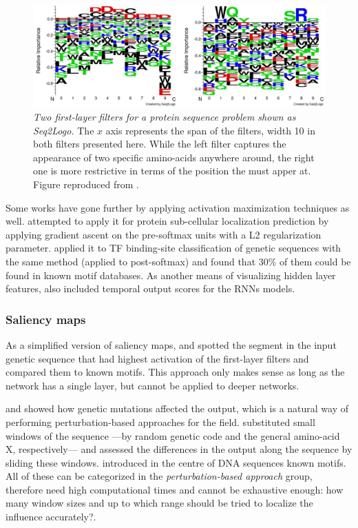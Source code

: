 		\begin{figure}
		\centering
		\includegraphics[width=0.7\linewidth]{Figures/seqlogo}
		\caption{\textit{Two first-layer filters for a protein sequence problem shown as Seq2Logo.} The $x$ axis represents the span of the filters, width 10 in both filters presented here. While the left filter captures the appearance of two specific amino-acids anywhere around, the right one is more restrictive in terms of the position the must apper at. Figure reproduced from \cite{Fontal2017}.}
		\label{fig:seqlogo}
		\end{figure}
		
		Some works have gone further by applying activation maximization techniques as well. \cite{Fontal2017} attempted to apply it for protein sub-cellular localization prediction by applying gradient ascent on the pre-softmax units with a L2 regularization parameter. \cite{Lanchantin2016} applied it to TF binding-site classification of genetic sequences with the same method (applied to post-softmax) and found that 30\% of them could be found in known motif databases. As another means of visualizing hidden layer features, \cite{Lanchantin2016} also included temporal output scores for the RNNs models.
	
		\subsubsection*{Saliency maps}
		As a simplified version of saliency maps, \cite{Alipanahi2015} and \cite{Quang2016} spotted the segment in the input genetic sequence that had highest activation of the first-layer filters and compared them to known motifs. This approach only makes sense as long as the network has a single layer, but cannot be applied to deeper networks.
		
		\cite{Alipanahi2015} and \cite{Zhou2015} showed how genetic mutations affected the output, which is a natural way of performing perturbation-based approaches for the field. \cite{Umarov2017,Fontal2017} substituted small windows of the sequence ---by random genetic code and the general amino-acid X, respectively--- and assessed the differences in the output along the sequence by sliding these windows. \cite{Kelley2016} introduced in the centre of DNA sequences known motifs. All of these can be categorized in the \textit{perturbation-based approach} group, therefore need high computational times and cannot be exhaustive enough: how many window sizes and up to which range should be tried to localize the influence accurately?.
		

